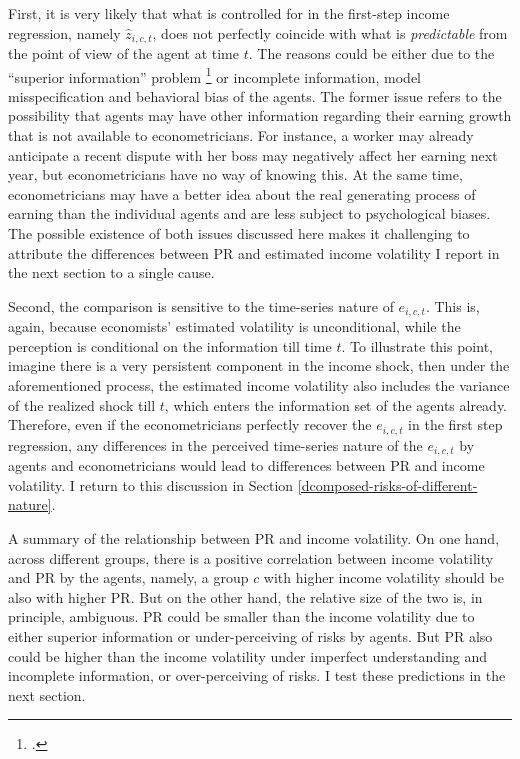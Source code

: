 First, it is very likely that what is controlled for in the first-step income regression, namely $\hat z_{i,c,t}$, does not perfectly coincide with what is \emph{predictable} from the point of view of the agent at time $t$. The reasons could be either due to the ``superior information'' problem \footnote{\cite{pistaferri_superior_2001, kaufmann_disentangling_2009}.} or incomplete information, model misspecification and behavioral bias of the agents. The former issue refers to the possibility that agents may have other information regarding their earning growth that is not available to econometricians. For instance, a worker may already anticipate a recent dispute with her boss may negatively affect her earning next year, but econometricians have no way of knowing this. At the same time, econometricians may have a better idea about the real generating process of earning than the individual agents and are less subject to psychological biases. 
The possible existence of both issues discussed here makes it challenging to attribute the differences between PR and estimated income volatility I report in the next section to a single cause. 

Second, the comparison is sensitive to the time-series nature of $e_{i,c,t}$. This is, again, because economists' estimated volatility is unconditional, while the perception is conditional on the information till time $t$. To illustrate this point, imagine there is a very persistent component in the income shock, then under the aforementioned process, the estimated income volatility also includes the variance of the realized shock till $t$, which enters the information set of the agents already. Therefore, even if the econometricians perfectly recover the $e_{i,c,t}$ in the first step regression, any differences in the perceived time-series nature of the $e_{i,c,t}$ by agents and econometricians would lead to differences between PR and income volatility. I return to this discussion in Section \ref{dcomposed-risks-of-different-nature}. 

A summary of the relationship between PR and income volatility. On one hand, across different groups, there is a positive correlation between income volatility and PR by the agents, namely, a group $c$ with higher income volatility should be also with higher PR. But on the other hand, the relative size of the two is, in principle, ambiguous. PR could be smaller than the income volatility due to either superior information or under-perceiving of risks by agents. But PR also could be higher than the income volatility under imperfect understanding and incomplete information, or over-perceiving of risks. I test these predictions in the next section. 

